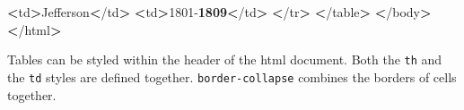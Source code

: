 \documentclass[]{book}
\newenvironment{Shaded}{\begin{snugshade}}{\end{snugshade}}
\newcommand{\OperatorTok}[1]{\textcolor[rgb]{0.81,0.36,0.00}{\textbf{#1}}}
\newcommand{\ExtensionTok}[1]{#1}
\newcommand{\NormalTok}[1]{#1}
\begin{document}
\begin{Shaded}
\begin{Highlighting}[]
                \OperatorTok{<}\ExtensionTok{td}\OperatorTok{>}\NormalTok{Jefferson}\OperatorTok{<}\NormalTok{/td}\OperatorTok{>}      
                \OperatorTok{<}\ExtensionTok{td}\OperatorTok{>}\NormalTok{1801-}\OperatorTok{1809<}\NormalTok{/td}\OperatorTok{>}      
            \OperatorTok{<}\NormalTok{/}\ExtensionTok{tr}\OperatorTok{>}                       
        \OperatorTok{<}\NormalTok{/}\ExtensionTok{table}\OperatorTok{>}                        
    \OperatorTok{<}\NormalTok{/}\ExtensionTok{body}\OperatorTok{>}             
\OperatorTok{<}\NormalTok{/}\ExtensionTok{html}\OperatorTok{>}                 
\end{Highlighting}
\end{Shaded}

Tables can be styled within the header of the html document. Both the
\texttt{th} and the \texttt{td} styles are defined together.
\texttt{border-collapse} combines the borders of cells together.
\end{document}
